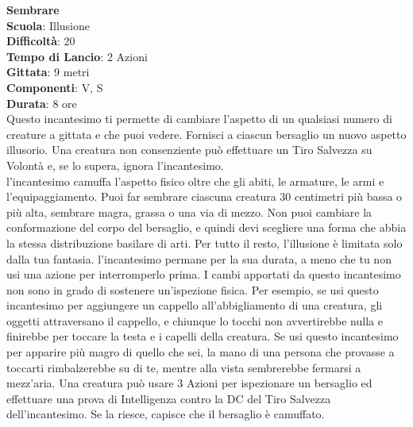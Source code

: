 \begin{multicols}{2}
\medskip\textbf{Sembrare}\\
\textbf{Scuola}: Illusione\\
\textbf{Difficoltà}:  20\\
\textbf{Tempo di Lancio}: 2 Azioni\\
\textbf{Gittata}: 9 metri\\
\textbf{Componenti}: V, S\\
\textbf{Durata}: 8 ore\\
Questo incantesimo ti permette di cambiare l’aspetto di un qualsiasi numero di creature a gittata e che puoi vedere. Fornisci a ciascun bersaglio un nuovo aspetto illusorio. Una creatura non consenziente può effettuare un Tiro Salvezza su Volontà e, se lo supera, ignora l'incantesimo.\\
l'incantesimo camuffa l’aspetto fisico oltre che gli abiti, le armature, le armi e l’equipaggiamento. Puoi far sembrare ciascuna creatura 30 centimetri più bassa o più alta, sembrare magra, grassa o una via di mezzo. Non puoi cambiare la conformazione del corpo del bersaglio, e quindi devi scegliere una forma che abbia la stessa distribuzione basilare di arti. Per tutto il resto, l’illusione è limitata solo dalla tua fantasia. l'incantesimo permane per la sua durata, a meno che tu non usi una azione per interromperlo prima. I cambi apportati da questo incantesimo non sono in grado di sostenere un'ispezione fisica. Per esempio, se usi questo incantesimo per aggiungere un cappello all'abbigliamento di una creatura, gli oggetti attraversano il cappello, e chiunque lo tocchi non avvertirebbe nulla e finirebbe per toccare la testa e i capelli della creatura. Se usi questo incantesimo per apparire più magro di quello che sei, la mano di una persona che provasse a toccarti rimbalzerebbe su di te, mentre alla vista sembrerebbe fermarsi a mezz’aria. Una creatura può usare 3 Azioni per ispezionare un bersaglio ed effettuare una prova di Intelligenza contro la DC del Tiro Salvezza  dell'incantesimo. Se la riesce, capisce che il bersaglio è camuffato.


\end{multicols}
